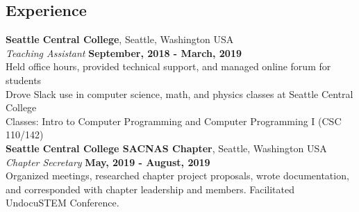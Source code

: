 \documentclass[margin,line]{res}
\newenvironment{list2}{
  \begin{list}{$\bullet$}{%
      \setlength{\itemsep}{0in}
      \setlength{\parsep}{0in} \setlength{\parskip}{0in}
      \setlength{\topsep}{0in} \setlength{\partopsep}{0in} 
      \setlength{\leftmargin}{0.2in}}}{\end{list}}
\begin{document}
\begin{resume}
\section{\sc Experience}
{\bf Seattle Central College}, Seattle, Washington USA \\
{\em Teaching Assistant} \hfill {\bf September, 2018  - March, 2019}\\
Held office hours, provided technical support, and managed online forum for students \\
Drove Slack use in computer science, math, and physics classes at Seattle Central College \\
Classes: Intro to Computer Programming and Computer Programming I (CSC 110/142) \\

%
%
%
%
%
{\bf Seattle Central College SACNAS Chapter}, Seattle, Washington USA \\ 
%
{\em Chapter Secretary} \hfill {\bf May, 2019 - August, 2019}\\
  Organized meetings, researched chapter project proposals, wrote documentation, and 
  corresponded with chapter leadership and members. Facilitated UndocuSTEM Conference.

\end{resume}
\end{document}
